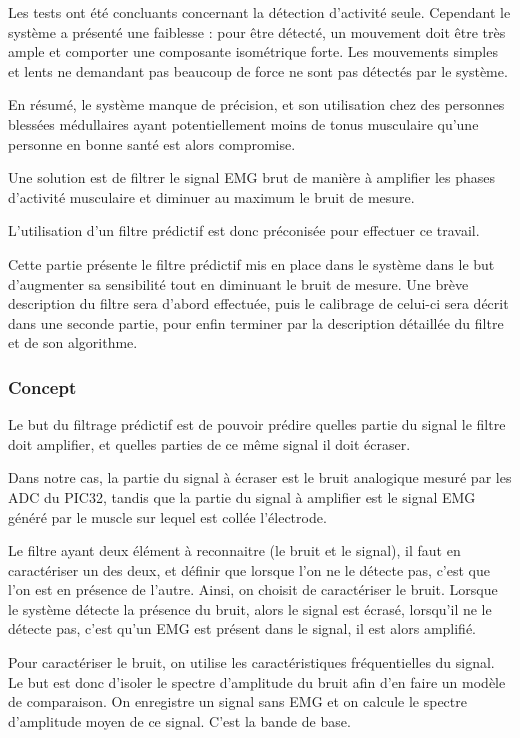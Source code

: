 \documentclass[letterpaper, twoside, 12pt, memoire, creativecommons, hyperref]{thETS}
\begin{document}
Les tests ont été concluants concernant la détection d'activité seule. Cependant le système a présenté une faiblesse : pour être détecté, un mouvement doit être très ample et comporter une composante isométrique forte. Les mouvements simples et lents ne demandant pas beaucoup de force ne sont pas détectés par le système. 

En résumé, le système manque de précision, et son utilisation chez des personnes blessées médullaires ayant potentiellement moins de tonus musculaire qu'une personne en bonne santé est alors compromise. 

Une solution est de filtrer le signal EMG brut de manière à amplifier les phases d'activité musculaire et diminuer au maximum le bruit de mesure. 

L'utilisation d'un filtre prédictif est donc préconisée pour effectuer ce travail. 

Cette partie présente le filtre prédictif mis en place dans le système dans le but d'augmenter sa sensibilité tout en diminuant le bruit de mesure. Une brève description du filtre sera d'abord effectuée, puis le calibrage de celui-ci sera décrit dans une seconde partie, pour enfin terminer par la description détaillée du filtre et de son algorithme.

\subsubsection{Concept}

Le but du filtrage prédictif est de pouvoir prédire quelles partie du signal le filtre doit amplifier, et quelles parties de ce même signal il doit écraser.

Dans notre cas, la partie du signal à écraser est le bruit analogique mesuré par les ADC du PIC32, tandis que la partie du signal à amplifier est le signal EMG généré par le muscle sur lequel est collée l'électrode.

Le filtre ayant deux élément à reconnaitre (le bruit et le signal), il faut en caractériser un des deux, et définir que lorsque l'on ne le détecte pas, c'est que l'on est en présence de l'autre. Ainsi, on choisit de caractériser le bruit. Lorsque le système détecte la présence du bruit, alors le signal est écrasé, lorsqu'il ne le détecte pas, c'est qu'un EMG est présent dans le signal, il est alors amplifié.

Pour caractériser le bruit, on utilise les caractéristiques fréquentielles du signal. Le but est donc d'isoler le spectre d'amplitude du bruit afin d'en faire un modèle de comparaison. On enregistre un signal sans EMG et on calcule le spectre d'amplitude moyen de ce signal. C'est la bande de base.
\end{document}
